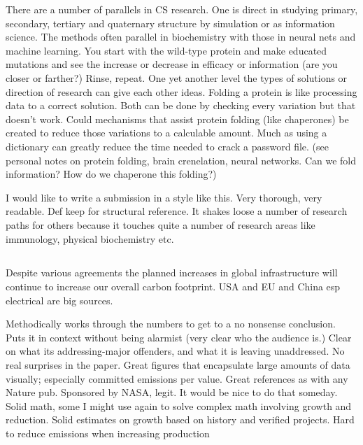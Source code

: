 \documentclass{article}
\begin{document}
There are a number of parallels in CS research. One is direct in studying primary, secondary, tertiary and quaternary structure by simulation or as information science. The methods often parallel in biochemistry with those in neural nets and machine learning. You start with the wild-type protein and make educated mutations and see the increase or decrease in efficacy or information (are you closer or farther?) Rinse, repeat. One yet another level the types of solutions or direction of research can give each other ideas. Folding a protein is like processing data to a correct solution. Both can be done by checking every variation but that doesn't work. Could mechanisms that assist protein folding (like chaperones) be created to reduce those variations to a calculable amount. Much as using a dictionary can greatly reduce the time needed to crack a password file. (see personal notes on protein folding, brain crenelation, neural networks. Can we fold information? How do we chaperone this folding?)

I would like to write a submission in a style like this. Very thorough, very readable. Def keep for structural reference. It shakes loose a number of research paths for others because it touches quite a number of research areas like immunology, physical biochemistry etc.
\subsection{}
\citeauthor{tong_committed_2019} Despite various agreements the planned increases in global infrastructure will continue to increase our overall carbon footprint. USA and EU and China esp electrical are big sources.

Methodically works through the numbers to get to a no nonsense conclusion. Puts it in context without being alarmist (very clear who the audience is.) Clear on what its addressing-major offenders, and what it is leaving unaddressed. No real surprises in the paper. Great figures that encapsulate large amounts of data visually; especially committed emissions per value. Great references as with any Nature pub. Sponsored by NASA, legit. It would be nice to do that someday. Solid math, some I might use again to solve complex math involving growth and reduction. Solid estimates on growth based on history and verified projects. Hard to reduce emissions when increasing production
\end{document}
